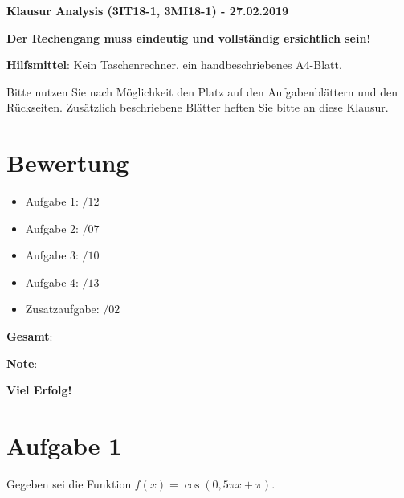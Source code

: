 \documentclass[12pt]{article}
\begin{document}
\thispagestyle{firstpage}

\begin{center}
{\bf {\large Klausur Analysis (3IT18-1, 3MI18-1) - 27.02.2019}}
\end{center}

\begin{center}
\textbf {Der Rechengang muss eindeutig und vollständig ersichtlich sein!}
\end{center}

\textbf{Hilfsmittel}: Kein Taschenrechner, ein handbeschriebenes A4-Blatt.

\begin{center}
Bitte nutzen Sie nach Möglichkeit den Platz auf den Aufgabenblättern und den Rückseiten. Zusätzlich beschriebene Blätter heften Sie bitte an diese Klausur.
\end{center}

\section*{Bewertung}

\begin{itemize}
\item Aufgabe 1:      \space\space\space\space\space$/12$
\item Aufgabe 2:      \space\space\space\space\space$/07$
\item Aufgabe 3:      \space\space\space\space\space$/10$
\item Aufgabe 4:      \space\space\space\space\space$/13$
\item Zusatzaufgabe:  \space\space\space\space\space$/02$
\end{itemize}

\textbf{Gesamt}: \space\space\space\space\space %

\textbf{Note}:

\begin{center}
{\bf {\large Viel Erfolg!}}
\end{center}



\newpage
\section* {Aufgabe 1}

Gegeben sei die Funktion $f(x) = \cos(0{,}5 \pi x + \pi)$.
\end{document}

